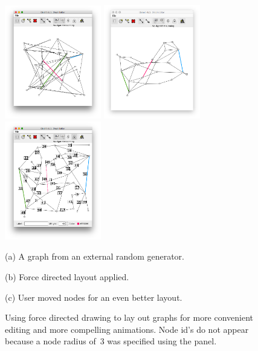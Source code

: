 \begin{figure}
  \begin{center}

    \hspace*{-4em}
    \includegraphics[width=0.375\textwidth]{X-r_25_40_1}
    \hspace{-2em}
    \includegraphics[width=0.375\textwidth]{X-r_25_40_1-fd}
    \hspace{-2em}
    \includegraphics[width=0.375\textwidth]{X-r_25_40_1-edited}

    \hspace*{-4em}
    \parbox[c][3ex][c]{0.35\textwidth}{
      (a) A graph from an external random generator.
    }
    \parbox[c][3ex][c]{0.35\textwidth}{
    (b) Force directed layout applied.
    }
    \parbox[c][3ex][c]{0.35\textwidth}{
    (c) User moved nodes for an even better layout.
    }

  \end{center}

  \bigskip
  \caption{Using force directed drawing to lay out graphs for more convenient
    editing and more compelling animations. Node id's do not appear because
    a node radius of~3 was specified using the
     panel.}

  \label{fig:force_directed}
\end{figure}

